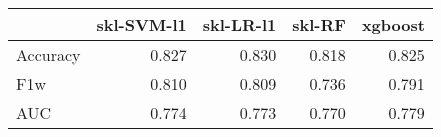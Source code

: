 \begin{tabular}{lrrrr}
\toprule
{} &  skl-SVM-l1 &  skl-LR-l1 &  skl-RF &  xgboost \\
\midrule
Accuracy &       0.827 &      0.830 &   0.818 &    0.825 \\
F1w      &       0.810 &      0.809 &   0.736 &    0.791 \\
AUC      &       0.774 &      0.773 &   0.770 &    0.779 \\
\bottomrule
\end{tabular}
